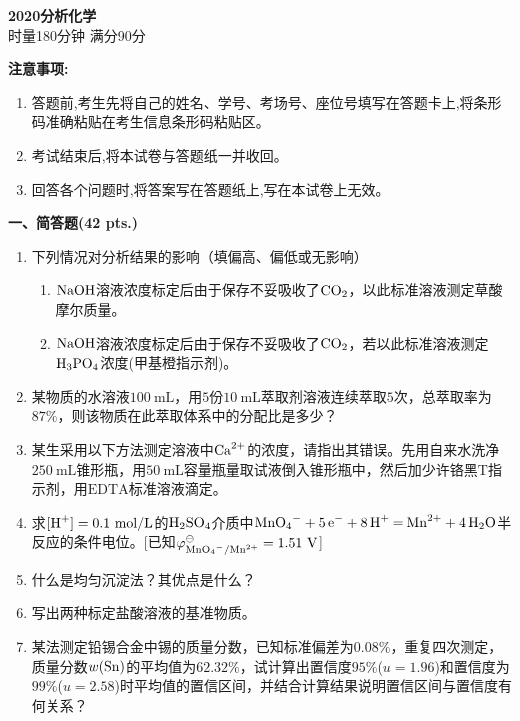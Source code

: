 \begin{center}
    {\LARGE \textbf{2020分析化学}} \\[2ex]
    {\large 时量180分钟 \quad 满分90分}
\end{center}

\vspace{0.5cm}
\noindent\textbf{注意事项:}
\begin{enumerate}[label=\arabic*., parsep=0pt, itemsep=0pt]
    \item 答题前,考生先将自己的姓名、学号、考场号、座位号填写在答题卡上,将条形码准确粘贴在考生信息条形码粘贴区。
    \item 考试结束后,将本试卷与答题纸一并收回。
    \item 回答各个问题时,将答案写在答题纸上,写在本试卷上无效。
\end{enumerate}

\vspace{0.5cm}
\noindent\textbf{一、简答题(42 pts.)}

\begin{enumerate}[label=\arabic*., itemsep=1.5ex]
    \item 下列情况对分析结果的影响（填偏高、偏低或无影响）
    \begin{enumerate}[label=(\arabic*), noitemsep, topsep=0pt, partopsep=0pt]
        \item $\ce{NaOH}$溶液浓度标定后由于保存不妥吸收了$\ce{CO2}$，以此标准溶液测定草酸摩尔质量。
        \item $\ce{NaOH}$溶液浓度标定后由于保存不妥吸收了$\ce{CO2}$，若以此标准溶液测定$\ce{H3PO4}$浓度(甲基橙指示剂)。
    \end{enumerate}
    \item 某物质的水溶液$100\ \mathrm{mL}$，用$5$份$10\ \mathrm{mL}$萃取剂溶液连续萃取$5$次，总萃取率为$87\%$，则该物质在此萃取体系中的分配比是多少？
    \item 某生采用以下方法测定溶液中$\ce{Ca^{2+}}$的浓度，请指出其错误。先用自来水洗净$250\ \mathrm{mL}$锥形瓶，用$50\ \mathrm{mL}$容量瓶量取试液倒入锥形瓶中，然后加少许铬黑$\mathrm{T}$指示剂，用$\mathrm{EDTA}$标准溶液滴定。
    \item 求$[\ce{H^+}]=0.1\ \mathrm{mol/L}$的$\ce{H2SO4}$介质中$\ce{MnO4^- +5e^- +8H^+ = Mn^{2+} +4H2O}$半反应的条件电位。[已知$\varphi^\ominus_{\ce{MnO4^-/Mn^{2+}}}=1.51\ \mathrm{V}$]
    \item 什么是均匀沉淀法？其优点是什么？
    \item 写出两种标定盐酸溶液的基准物质。
    \item 某法测定铅锡合金中锡的质量分数，已知标准偏差为$0.08\%$，重复四次测定，质量分数$w(\ce{Sn})$的平均值为$62.32\%$，试计算出置信度$95\%$($u=1.96$)和置信度为$99\%$($u=2.58$)时平均值的置信区间，并结合计算结果说明置信区间与置信度有何关系？
\end{enumerate}

